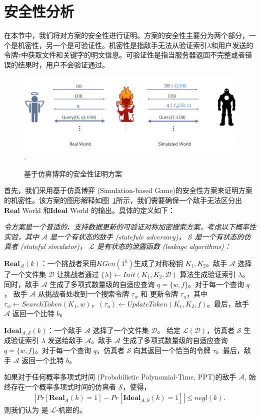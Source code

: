 \section{安全性分析}
在本节中，我们将对方案的安全性进行证明。方案的安全性主要分为两个部分，一个是机密性，另一个是可验证性。机密性是指敌手无法从验证索引$\lambda$和用户发送的令牌$\tau$中获取文件和关键字的明文信息。可验证性是指当服务器返回不完整或者错误的结果时，用户不会验证通过。
\begin{figure}[t]
\centering
\includegraphics[width=6 in]{fig/security.png}
\DeclareGraphicsExtensions.
\caption{基于仿真博弈的安全性证明方案}
\label{fig:security}
\end{figure}

首先，我们采用基于仿真博弈 (Simulation-based Game)的安全性方案来证明方案的机密性。该方案的图形解释如图~\ref{fig:security}所示，我们需要确保一个敌手无法区分出$\mathbf{Real}$ World 和$\mathbf{Ideal}$ World 的输出。具体的定义如下：

\begin{definition}
  {\itshape
      令方案\single 是一个普适的、支持数据更新的可验证对称加密搜索方案，考虑以下概率性实验，其中 $\mathcal{A}$ 是一个有状态的敌手 (statefule adversary)， $\mathcal{S}$ 是一个有状态的仿真者 (stateful simulator)， $\mathcal{L}$ 是有状态的泄露函数 (leakage algorithms)：

      $\mathbf{Real}_\mathcal{A}(k)$：一个挑战者采用$KGen(1^k)$生成了对称秘钥 $K_1,K_2$。敌手 $\mathcal{A}$ 选择了一个文件集 $\mathcal{D}$ 让挑战者通过 $\{\lambda\} \leftarrow Init(K_1,K_2,\mathcal{D})$ 算法生成验证索引 $\lambda$。同时，敌手 $\mathcal{A}$ 生成了多项式数量级的自适应查询 $q = \{w,f\}$。对于每一个查询 $q$， 敌手 $\mathcal{A}$ 从挑战者处收到一个搜索令牌 $\tau_w$ 和 更新令牌 $\tau_u$，其中 $\tau_w \leftarrow SearchToken(K_1,w)$，$(\tau_u) \leftarrow UpdateToken(K_1,K_2,f)$。最后，敌手 $\mathcal{A}$ 返回一个比特 $b$。

      $\mathbf{Ideal}_\mathcal{A,S}(k)$：一个敌手 $\mathcal{A}$ 选择了一个文件集 $\mathcal{D}$。 给定 $\mathcal{L}(\mathcal{D})$，仿真者 $\mathcal{S}$ 生成验证索引 $\lambda$ 发送给敌手 $\mathcal{A}$。敌手 $\mathcal{A}$ 生成了多项式数量级的自适应查询 $q = \{w,f\}$。对于每一个查询 $q$，仿真者 $\mathcal{S}$ 向其返回一个恰当的令牌 $\tau$。最后，敌手 $\mathcal{A}$ 返回一个比特 $b$。

      如果对于任何概率多项式时间 (Probabilistic Polynomial-Time, PPT)的敌手 $\mathcal{A}$, 始终存在一个概率多项式时间的仿真者 $\mathcal{S}$，使得，
      \begin{align}
        |Pr[\mathbf{Real}_A(k) = 1] - Pr[\mathbf{Ideal}_{A,S}(k) = 1]| \leq negl(k).
      \end{align}
      则我们认为 \single 是 $\mathcal{L}$-机密的。
  }
\end{definition}

